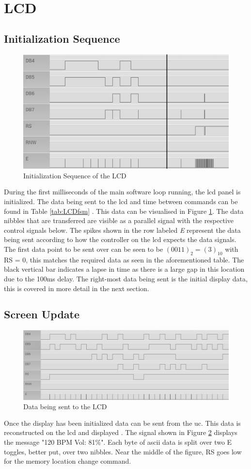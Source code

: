 \documentclass[12pt,a4paper]{report}
\begin{document}
\section{LCD}
\subsection{Initialization Sequence}
\begin{figure}[h!]
	\centering
	\includegraphics[width=0.7 \textwidth]{LCD_Init.PNG}
	\caption{Initialization Sequence of the LCD }
	\label{fig:lcdInit}
\end{figure}
\noindent During the first milliseconds of the main software loop running, the \ac{lcd} panel is initialized. The data being sent to the \ac{lcd} and time between commands can be found in Table \ref{tab:LCDfsm} \cite{lcd}. This data can be visualised in Figure \ref{fig:lcdInit}. The data nibbles that are transferred are visible as a parallel signal with the respective control signals below. The spikes shown in the row labeled \textit{E} represent the data being sent according to how the controller on the \ac{lcd} expects the data signals. The first data point to be sent over can be seen to be $(0011)_2 = (3)_{10}$ with RS = 0, this matches the required data as seen in the aforementioned table. The black vertical bar indicates a lapse in time as there is a large gap in this location due to the 100ms delay. The right-most data being sent is the initial display data, this is covered in more detail in the next section.
\subsection{Screen Update}
\begin{figure}[h!]
	\centering
	\includegraphics[width=0.8 \textwidth]{LCD_Data.PNG}
	\caption{Data being sent to the LCD}
	\label{fig:lcdDataExpl}
\end{figure}
\noindent Once the display has been initialized data can be sent from the \ac{uc}. This data is reconstructed on the \ac{lcd} and displayed \cite{lcd}. The signal shown in Figure \ref{fig:lcdDataExpl} displays the message "120 BPM Vol: 81\%". Each byte of \ac{ascii} data is split over two E toggles, better put, over two nibbles. Near the middle of the figure, RS goes low for the memory location change command. 
\end{document}

